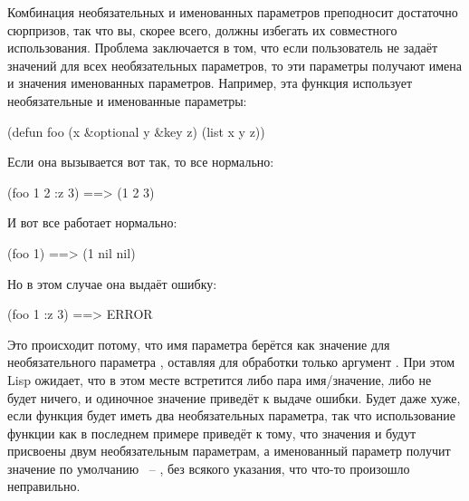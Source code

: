 Комбинация необязательных и именованных параметров преподносит достаточно сюрпризов, так
что вы, скорее всего, должны избегать их совместного использования.  Проблема заключается в
том, что если пользователь не задаёт значений для всех необязательных параметров, то эти
параметры получают имена и значения именованных параметров.  Например, эта функция
использует необязательные и именованные параметры:

\begin{myverb}
  (defun foo (x &optional y &key z) 
    (list x y z))
\end{myverb}

Если она вызывается вот так, то все нормально:

\begin{myverb}
  (foo 1 2 :z 3) ==> (1 2 3)
\end{myverb}

И вот все работает нормально:

\begin{myverb}
  (foo 1)  ==> (1 nil nil)
\end{myverb}

Но в этом случае она выдаёт ошибку:

\begin{myverb}
  (foo 1 :z 3) ==> ERROR
\end{myverb}

Это происходит потому, что имя параметра  берётся как значение для
необязательного параметра , оставляя для обработки только аргумент .  При
этом Lisp ожидает, что в этом месте встретится либо пара имя/значение, либо не будет
ничего, и одиночное значение приведёт к выдаче ошибки.  Будет даже хуже, если функция
будет иметь два необязательных параметра, так что использование функции как в последнем
примере приведёт к тому, что значения  и  будут присвоены двум
необязательным параметрам, а именованный параметр  получит значение по умолчанию
~-- , без всякого указания, что что-то произошло неправильно.

